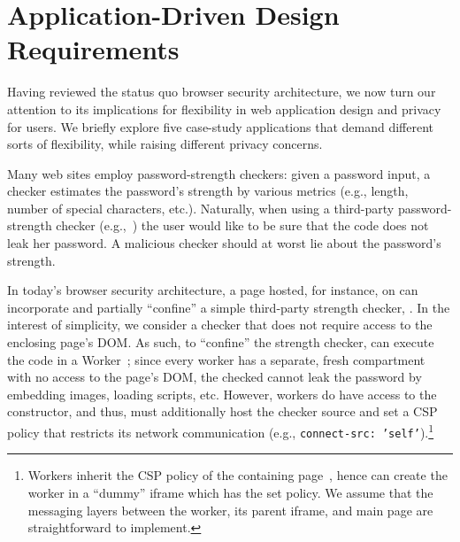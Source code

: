\section{Application-Driven Design Requirements}
\label{sec:goals}

Having reviewed the status quo browser security architecture, we now
turn our attention to its implications for flexibility in web
application design and privacy for users. We briefly explore five
case-study applications that demand different sorts of flexibility,
while raising different privacy concerns.

Many web sites employ password-strength checkers:
%
given a password input, a checker estimates the password's strength by
various metrics (e.g., length, number of special characters, etc.).
%
Naturally, when using a third-party password-strength checker
(e.g.,~\cite{checker1}) the user would like to be sure that the
code does not leak her password.
%
A malicious checker should at worst lie about the password's strength.

In today's browser security architecture, a page hosted, for instance,
on  can incorporate and partially ``confine'' a
simple third-party strength checker, .
%
In the interest of simplicity, we consider a checker that does not
require access to the enclosing page's DOM.
%
As such, to ``confine'' the strength checker, 
can execute the code in a Worker~\cite{workers};
%
since every worker has a separate, fresh compartment with no
access to the page's DOM, the checked cannot leak the password
by embedding images, loading scripts, etc.
%
However, workers do have access to the \xhr{} constructor, and thus,
 must additionally host the checker source and set
a CSP policy that restricts its network communication (e.g.,
\texttt{connect-src: 'self'}).\footnote{
  Workers inherit the CSP policy of the containing page~\cite{csp},
  hence  can create the worker in a ``dummy''
  iframe which has the set policy.
  We assume that the messaging layers between the worker, its parent
  iframe, and main page are straightforward to implement.
}
%

